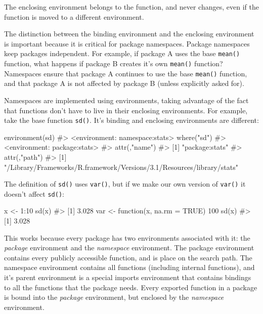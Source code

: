 \documentclass[oneside]{book}
\newenvironment{Shaded}{}{}
\newcommand{\KeywordTok} [1]{\textcolor[rgb]{0.00,0.44,0.13}{{#1}}}
\newcommand{\DataTypeTok}[1]{\textcolor[rgb]{0.56,0.13,0.00}{{#1}}}
\newcommand{\DecValTok}  [1]{\textcolor[rgb]{0.25,0.63,0.44}{{#1}}}
\newcommand{\StringTok}  [1]{\textcolor[rgb]{0.25,0.44,0.63}{{#1}}}
\newcommand{\CommentTok} [1]{\textcolor[rgb]{0.38,0.63,0.69}{{#1}}}
\newcommand{\OtherTok}   [1]{\textcolor[rgb]{0.00,0.44,0.13}{{#1}}}
\newcommand{\NormalTok}  [1]{{#1}}
\begin{document}
The enclosing environment belongs to the function, and never changes,
even if the function is moved to a different environment.

The distinction between the binding environment and the enclosing
environment is important because it is critical for package namespaces.
Package namespaces keep packages independent. For example, if package A
uses the base \texttt{mean()} function, what happens if package B
creates it's own \texttt{mean()} function? Namespaces ensure that
package A continues to use the base \texttt{mean()} function, and that
package A is not affected by package B (unless explicitly asked for).

Namespaces are implemented using environments, taking advantage of the
fact that functions don't have to live in their enclosing environments.
For example, take the base function \texttt{sd()}. It's binding and
enclosing environments are different:

\begin{Shaded}
\begin{Highlighting}[]
\KeywordTok{environment}\NormalTok{(sd)}
\CommentTok{#> <environment: namespace:stats>}
\KeywordTok{where}\NormalTok{(}\StringTok{"sd"}\NormalTok{)}
\CommentTok{#> <environment: package:stats>}
\CommentTok{#> attr(,"name")}
\CommentTok{#> [1] "package:stats"}
\CommentTok{#> attr(,"path")}
\CommentTok{#> [1] "/Library/Frameworks/R.framework/Versions/3.1/Resources/library/stats"}
\end{Highlighting}
\end{Shaded}

The definition of \texttt{sd()} uses \texttt{var()}, but if we make our
own version of \texttt{var()} it doesn't affect \texttt{sd()}:

\begin{Shaded}
\begin{Highlighting}[]
\NormalTok{x <-}\StringTok{ }\DecValTok{1}\NormalTok{:}\DecValTok{10}
\KeywordTok{sd}\NormalTok{(x)}
\CommentTok{#> [1] 3.028}
\NormalTok{var <-}\StringTok{ }\NormalTok{function(x, }\DataTypeTok{na.rm =} \OtherTok{TRUE}\NormalTok{) }\DecValTok{100}
\KeywordTok{sd}\NormalTok{(x)}
\CommentTok{#> [1] 3.028}
\end{Highlighting}
\end{Shaded}

This works because every package has two environments associated with
it: the \emph{package} environment and the \emph{namespace} environment.
The package environment contains every publicly accessible function, and
is place on the search path. The namespace environment contains all
functions (including internal functions), and it's parent environment is
a special imports environment that contains bindings to all the
functions that the package needs. Every exported function in a package
is bound into the \emph{package} environment, but enclosed by the
\emph{namespace} environment.
\end{document}
